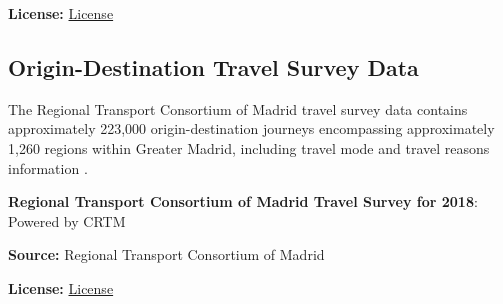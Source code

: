 \textbf{License:} \href{https://datos.madrid.es/portal/site/egob/menuitem.3efdb29b813ad8241e830cc2a8a409a0/?vgnextoid=108804d4aab90410VgnVCM100000171f5a0aRCRD&vgnextchannel=b4c412b9ace9f310VgnVCM100000171f5a0aRCRD&vgnextfmt=default}{License}

\subsection{Origin-Destination Travel Survey Data}

The Regional Transport Consortium of Madrid travel survey data contains approximately 223,000 origin-destination journeys encompassing approximately 1,260 regions within Greater Madrid, including travel mode and travel reasons information \cite{crtm_edm_2020,crtm_zones_2020}.

\textbf{Regional Transport Consortium of Madrid Travel Survey for 2018}: Powered by CRTM

\textbf{Source:} Regional Transport Consortium of Madrid

\textbf{License:} \href{https://www.crtm.es/licencia-de-uso}{License}
